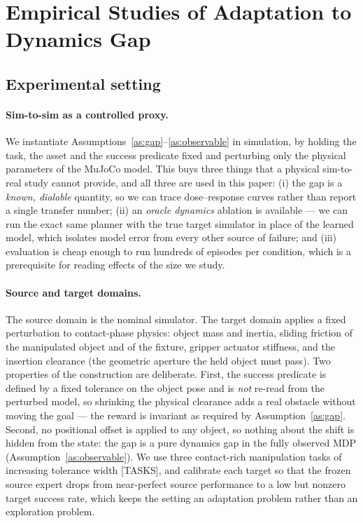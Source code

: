 \section{Empirical Studies of Adaptation to Dynamics Gap}
\label{empirical}

\subsection{Experimental setting}
\label{sec:setup}

\paragraph{Sim-to-sim as a controlled proxy.}
We instantiate Assumptions~\ref{as:gap}--\ref{as:observable} in simulation, by
holding the task, the asset and the success predicate fixed and perturbing only
the physical parameters of the MuJoCo model. This buys three things that a
physical sim-to-real study cannot provide, and all three are used in this
paper: (i) the gap is a \emph{known, dialable} quantity, so we can trace
dose--response curves rather than report a single transfer number;
(ii) an \emph{oracle dynamics} ablation is available --- we can run the exact
same planner with the true target simulator in place of the learned model,
which isolates model error from every other source of failure; and
(iii) evaluation is cheap enough to run hundreds of episodes per condition,
which is a prerequisite for reading effects of the size we study.

\paragraph{Source and target domains.}
The source domain is the nominal simulator. The target domain applies a fixed
perturbation to contact-phase physics: object mass and inertia, sliding
friction of the manipulated object and of the fixture, gripper actuator
stiffness, and the insertion clearance (the geometric aperture the held object
must pass). Two properties of the construction are deliberate. First, the
success predicate is defined by a fixed tolerance on the object pose and is
\emph{not} re-read from the perturbed model, so shrinking the physical
clearance adds a real obstacle without moving the goal --- the reward is
invariant as required by Assumption~\ref{as:gap}. Second, no positional offset
is applied to any object, so nothing about the shift is hidden from the state:
the gap is a pure dynamics gap in the fully observed MDP
(Assumption~\ref{as:observable}). We use three contact-rich manipulation tasks
of increasing tolerance width [TASKS], and calibrate each target so that the
frozen source expert drops from near-perfect source performance to a low but
nonzero target success rate, which keeps the setting an adaptation problem
rather than an exploration problem.

